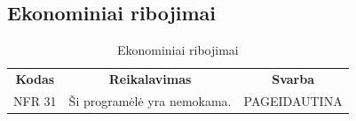 \documentclass{VUMIFPSkursinis}
\begin{document}
\subsection{Ekonominiai ribojimai}
\begin{center}
	\begin{table}[H]
	\caption{Ekonominiai ribojimai}
	\begin{tabular}{|p{2cm}|p{}|p{}|}
	\hline
	    \rowcolor{lightgray}
		\multicolumn{3}{|c|}{Ekonominiai ribojimai}\\
		
	\hline
		\multicolumn{1}{|c|}{{\bfseries Kodas}}&
		\multicolumn{1}{|c|}{{\bfseries Reikalavimas}}&
		\multicolumn{1}{|c|}{{\bfseries Svarba}}\\
	\hline 	
		\multicolumn{1}{|c|}{NFR 31}&
		{Ši programėlė yra nemokama.}&
		\multicolumn{1}{|p{1.5cm}|}{PAGEIDAUTINA}\\	
	
	\hline
	
	
	\end{tabular}
	
	\label{table:Ekonominiairibojimai}
	\end{table}

\end{center}
\end{document}
